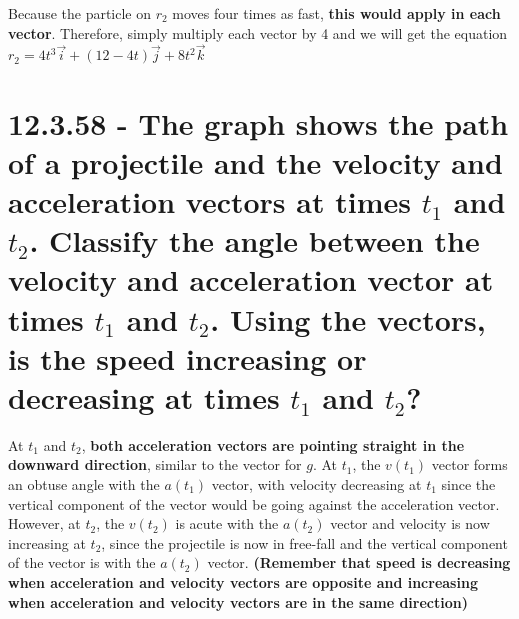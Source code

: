 \documentclass{article}
\begin{document}
\noindent\large Because the particle on $r_{2}$ moves four times as fast, \textbf{this would apply in each vector}.  Therefore, simply multiply each vector by 4 and we will get the equation $r_{2} = 4t^{3}\Vec{i} + (12 - 4t)\Vec{j} + 8t^{2}\Vec{k}$

\section{12.3.58 - The graph shows the path of a projectile and the velocity and acceleration vectors at times $t_{1}$ and $t_{2}$.  Classify the angle between the velocity and acceleration vector at times $t_{1}$ and $t_{2}$.  Using the vectors, is the speed increasing or decreasing at times $t_{1}$ and $t_{2}$?}

\noindent\large At $t_{1}$ and $t_{2}$, \textbf{both acceleration vectors are pointing straight in the downward direction}, similar to the vector for $g$.  At $t_{1}$, the $v(t_{1})$ vector forms an obtuse angle with the $a(t_{1})$ vector, with velocity decreasing at $t_{1}$ since the vertical component of the vector would be going against the acceleration vector.  However, at $t_{2}$, the $v(t_{2})$ is acute with the $a(t_{2})$ vector and velocity is now increasing at $t_{2}$, since the projectile is now in free-fall and the vertical component of the vector is with the $a(t_{2})$ vector. \textbf{(Remember that speed is decreasing when acceleration and velocity vectors are opposite and increasing when acceleration and velocity vectors are in the same direction)}
\end{document}
